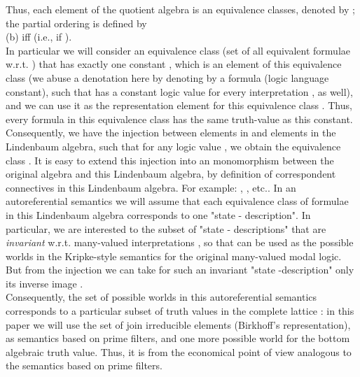 \documentclass[10pt,twocolumn]{article}
\begin{document}
Thus, each element of the quotient algebra  is an
 equivalence classes, denoted by ; the partial ordering
  is defined by\\ (b) iff  (i.e., if ).\\
  In particular we will consider an  equivalence class (set
 of all equivalent formulae w.r.t. )  that has exactly one
 constant , which is an element of this equivalence class (we abuse a denotation here by denoting by  a formula (logic language constant),
  such that has a constant logic value  for
 every interpretation ,  as well), and we
 can use it as the representation element for this equivalence
 class . Thus, every formula in this equivalence class has the same
 truth-value as this constant.
 Consequently, we have the injection  between elements in  
 and elements in the Lindenbaum algebra, such that for
 any logic value  ,  we obtain the equivalence class .
 It is easy to extend this injection into an monomorphism between the
 original algebra and this Lindenbaum algebra, by definition of
 correspondent connectives in this Lindenbaum algebra. For example:
 , ,
 etc..
In an autoreferential semantics we will assume that each equivalence
class of formulae  in this Lindenbaum algebra corresponds to
one "state - description". In particular, we are interested to the
subset of "state - descriptions" that are \emph{invariant} w.r.t.
many-valued interpretations , so that can be used as the possible
worlds in the Kripke-style semantics for the original many-valued
modal logic. But from the injection  we can take for such an
invariant
"state -description"  only its inverse image  .\\
Consequently, the set of possible worlds in this autoreferential
semantics corresponds to a particular subset of truth values in the
complete lattice :
 in this paper we will use the set of join irreducible elements (Birkhoff's representation),
 as semantics based on prime filters, and one more possible world for
the bottom algebraic truth value. Thus, it is from the economical
point of view analogous to the semantics based on prime filters.
\end{document}
